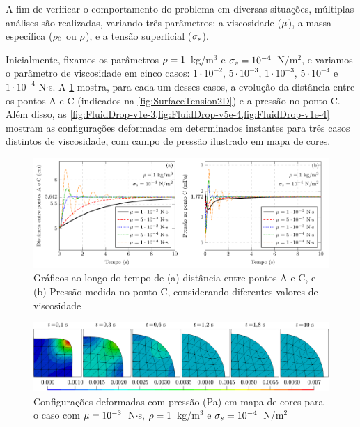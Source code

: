 \documentclass[Tese.tex]{subfiles}
\begin{document}
A fim de verificar o comportamento do problema em diversas situações, múltiplas análises são realizadas, variando três parâmetros: a viscosidade ($\mu$), a massa específica ($\rho_0$ ou $\rho$), e a tensão superficial ($\sigma_s$).

Inicialmente, fixamos os parâmetros $\rho = 1$~kg/m$^3$ e $\sigma_s = 10^{-4}$~N/m$^2$, e variamos o parâmetro de viscosidade em cinco casos: $1\cdot 10^{-2}$, $5\cdot 10^{-3}$, $1\cdot 10^{-3}$, $5\cdot 10^{-4}$ e $1\cdot 10^{-4}$ N$\cdot$s. A \cref{fig:FluidDrop-viscosity} mostra, para cada um desses casos, a evolução da distância entre os pontos A e C (indicados na \cref{fig:SurfaceTension2D}) e a pressão no ponto C. Além disso, as \cref{fig:FluidDrop-v1e-3,fig:FluidDrop-v5e-4,fig:FluidDrop-v1e-4} mostram as configurações deformadas em determinados instantes para três casos distintos de viscosidade, com campo de pressão ilustrado em mapa de cores.

\begin{figure}[!htb]
	\centering
	\caption{Gráficos ao longo do tempo de (a) distância entre pontos A e C, e (b) Pressão medida no ponto C, considerando diferentes valores de viscosidade}
	\label{fig:FluidDrop-viscosity}
	\includegraphics[scale=1.0]{Figuras/SurfaceTension2D/SurfaceTension2D-viscosity.pdf}
\end{figure}



\begin{figure}[!htb]
	\centering
	\caption{Configurações deformadas com pressão (Pa) em mapa de cores para o caso com $\mu = 10^{-3}$~N$\cdot$s, $\rho = 1$~kg/m$^3$ e $\sigma_s = 10^{-4}$~N/m$^2$}
	\label{fig:FluidDrop-v1e-3}
	\includegraphics[scale=0.42]{Figuras/SurfaceTension2D/Paraview/v1e-3.png}
\end{figure}
\end{document}
